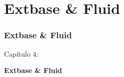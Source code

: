 %

\section{Extbase \& Fluid}
\begin{frame}[fragile]
	\frametitle{Extbase \& Fluid}

	\begin{center}\huge{Capítulo 4:}\end{center}
	\begin{center}\huge{\color{typo3darkgrey}\textbf{Extbase \& Fluid}}\end{center}

\end{frame}

